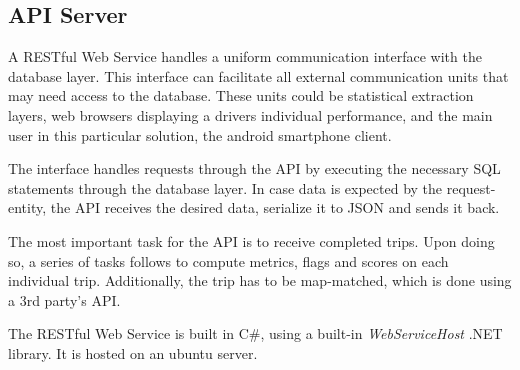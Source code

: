 \subsection{API Server}\label{subsec:api}
A RESTful Web Service handles a uniform communication interface with the database layer. This interface can facilitate all external communication units that may need access to the database. These units could be statistical extraction layers, web browsers displaying a drivers individual performance, and the main user in this particular solution, the android smartphone client. 

The interface handles requests through the API by executing the necessary SQL statements through the database layer. In case data is expected by the request-entity, the API receives the desired data, serialize it to JSON and sends it back.

The most important task for the API is to receive completed trips. Upon doing so, a series of tasks follows to  compute metrics, flags and scores on each individual trip. Additionally, the trip has to be map-matched, which is done using a 3rd party's API.

The RESTful Web Service is built in C\#, using a built-in \textit{WebServiceHost} .NET library. It is hosted on an ubuntu server.

